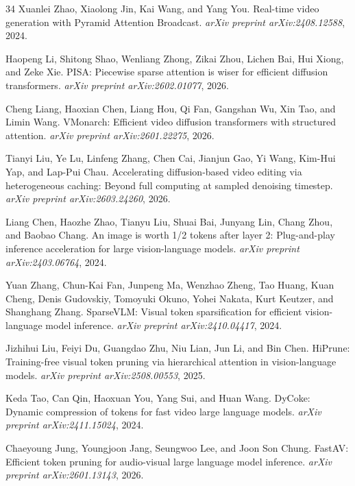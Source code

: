 \documentclass{article}
\begin{document}
\begin{thebibliography}{34}
Xuanlei Zhao, Xiaolong Jin, Kai Wang, and Yang You.
\newblock Real-time video generation with Pyramid Attention Broadcast.
\newblock \emph{arXiv preprint arXiv:2408.12588}, 2024.

Haopeng Li, Shitong Shao, Wenliang Zhong, Zikai Zhou, Lichen Bai, Hui Xiong, and Zeke Xie.
\newblock PISA: Piecewise sparse attention is wiser for efficient diffusion transformers.
\newblock \emph{arXiv preprint arXiv:2602.01077}, 2026.

Cheng Liang, Haoxian Chen, Liang Hou, Qi Fan, Gangshan Wu, Xin Tao, and Limin Wang.
\newblock VMonarch: Efficient video diffusion transformers with structured attention.
\newblock \emph{arXiv preprint arXiv:2601.22275}, 2026.

Tianyi Liu, Ye Lu, Linfeng Zhang, Chen Cai, Jianjun Gao, Yi Wang, Kim-Hui Yap, and Lap-Pui Chau.
\newblock Accelerating diffusion-based video editing via heterogeneous caching: Beyond full computing at sampled denoising timestep.
\newblock \emph{arXiv preprint arXiv:2603.24260}, 2026.

Liang Chen, Haozhe Zhao, Tianyu Liu, Shuai Bai, Junyang Lin, Chang Zhou, and Baobao Chang.
\newblock An image is worth 1/2 tokens after layer 2: Plug-and-play inference acceleration for large vision-language models.
\newblock \emph{arXiv preprint arXiv:2403.06764}, 2024.

Yuan Zhang, Chun-Kai Fan, Junpeng Ma, Wenzhao Zheng, Tao Huang, Kuan Cheng, Denis Gudovskiy, Tomoyuki Okuno, Yohei Nakata, Kurt Keutzer, and Shanghang Zhang.
\newblock SparseVLM: Visual token sparsification for efficient vision-language model inference.
\newblock \emph{arXiv preprint arXiv:2410.04417}, 2024.

Jizhihui Liu, Feiyi Du, Guangdao Zhu, Niu Lian, Jun Li, and Bin Chen.
\newblock HiPrune: Training-free visual token pruning via hierarchical attention in vision-language models.
\newblock \emph{arXiv preprint arXiv:2508.00553}, 2025.

Keda Tao, Can Qin, Haoxuan You, Yang Sui, and Huan Wang.
\newblock DyCoke: Dynamic compression of tokens for fast video large language models.
\newblock \emph{arXiv preprint arXiv:2411.15024}, 2024.

Chaeyoung Jung, Youngjoon Jang, Seungwoo Lee, and Joon Son Chung.
\newblock FastAV: Efficient token pruning for audio-visual large language model inference.
\newblock \emph{arXiv preprint arXiv:2601.13143}, 2026.


\end{thebibliography}
\end{document}
